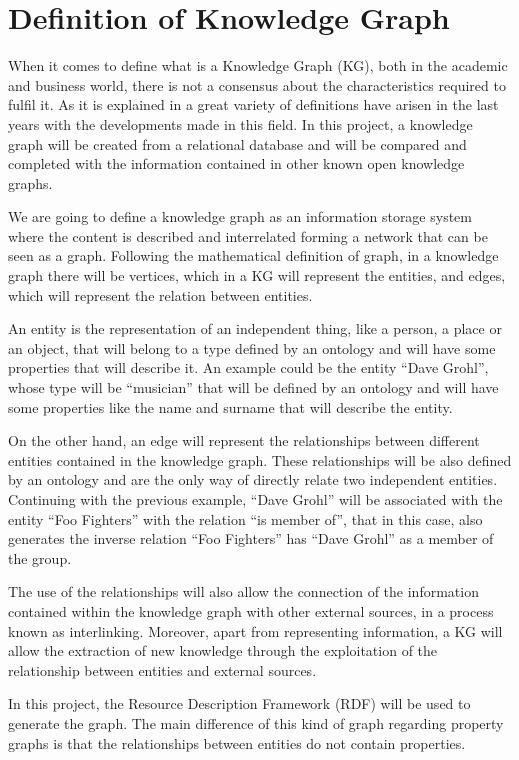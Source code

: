 \section{Definition of Knowledge Graph}
When it comes to define what is a Knowledge Graph (KG), both in the academic and business world, there is not a consensus about the characteristics required to fulfil it.
As it is explained in \citet{Ehrlinger2016} a great variety of definitions have arisen in the last years with the developments made in this field.
In this project, a knowledge graph will be created from a relational database and will be compared and completed with the information contained in other known open knowledge graphs. 

We are going to define a knowledge graph as an information storage system where the content is described and interrelated forming a network that can be seen as a graph.
Following the mathematical definition of graph, in a knowledge graph there will be vertices, which in a KG will represent the entities, and edges, which will represent the relation between entities.  

An entity is the representation of an independent thing, like a person, a place or an object, that will belong to a type defined by an ontology and will have some properties that will describe it.
An example could be the entity ``Dave Grohl'', whose type will be ``musician'' that will be defined by an ontology and will have some properties like the name and surname that will describe the entity. 

On the other hand, an edge will represent the relationships between different entities contained in the knowledge graph.
These relationships will be also defined by an ontology and are the only way of directly relate two independent entities.
Continuing with the previous example, ``Dave Grohl'' will be associated with the entity ``Foo Fighters'' with the relation ``is member of'', that in this case, also generates the inverse relation ``Foo Fighters'' has ``Dave Grohl'' as a member of the group. 

The use of the relationships will also allow the connection of the information contained within the knowledge graph with other external sources, in a process known as interlinking.
Moreover, apart from representing information, a KG will allow the extraction of new knowledge through the exploitation of the relationship between entities and external sources. 

In this project, the Resource Description Framework (RDF) will be used to generate the graph.
The main difference of this kind of graph regarding property graphs is that the relationships between entities do not contain properties.  
